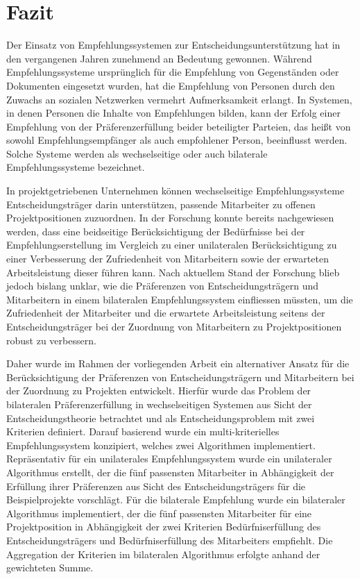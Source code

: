 
\chapter{Fazit}
\label{ch:fazit}
Der Einsatz von Empfehlungssystemen zur Entscheidungsunterstützung hat in den vergangenen Jahren zunehmend an Bedeutung gewonnen.
Während Empfehlungssysteme ursprünglich für die Empfehlung von Gegenständen oder Dokumenten eingesetzt wurden, hat die Empfehlung von Personen durch den Zuwachs an sozialen Netzwerken vermehrt Aufmerksamkeit erlangt.
In Systemen, in denen Personen die Inhalte von Empfehlungen bilden, kann der Erfolg einer Empfehlung von der Präferenzerfüllung beider beteiligter Parteien, das heißt von sowohl Empfehlungsempfänger als auch empfohlener Person, beeinflusst werden.
Solche Systeme werden als wechselseitige oder auch bilaterale Empfehlungssysteme bezeichnet.

In projektgetriebenen Unternehmen können wechselseitige Empfehlungssysteme Entscheidungsträger darin unterstützen, passende Mitarbeiter zu offenen Projektpositionen zuzuordnen.
In der Forschung konnte bereits nachgewiesen werden, dass eine beidseitige Berücksichtigung der Bedürfnisse bei der Empfehlungserstellung im Vergleich zu einer unilateralen Berücksichtigung zu einer Verbesserung der Zufriedenheit von Mitarbeitern sowie der erwarteten Arbeitsleistung dieser führen kann.
Nach aktuellem Stand der Forschung blieb jedoch bislang unklar, wie die Präferenzen von Entscheidungsträgern und Mitarbeitern in einem bilateralen Empfehlungssystem einfliessen müssten, um die Zufriedenheit der Mitarbeiter und die erwartete Arbeitsleistung seitens der Entscheidungsträger bei der Zuordnung von Mitarbeitern zu Projektpositionen robust zu verbessern.

Daher wurde im Rahmen der vorliegenden Arbeit ein alternativer Ansatz für die Berücksichtigung der Präferenzen von Entscheidungsträgern und Mitarbeitern bei der Zuordnung zu Projekten entwickelt.
Hierfür wurde das Problem der bilateralen Präferenzerfüllung in wechselseitigen Systemen aus Sicht der Entscheidungstheorie betrachtet und als Entscheidungsproblem mit zwei Kriterien definiert.
Darauf basierend wurde ein multi-kriterielles Empfehlungssystem konzipiert, welches zwei Algorithmen implementiert.
Repräsentativ für ein unilaterales Empfehlungssystem wurde ein unilateraler Algorithmus erstellt, der die fünf passensten Mitarbeiter in Abhängigkeit der Erfüllung ihrer Präferenzen aus Sicht des Entscheidungsträgers für die Beispielprojekte vorschlägt.
Für die bilaterale Empfehlung wurde ein bilateraler Algorithmus implementiert, der die fünf passensten Mitarbeiter für eine Projektposition in Abhängigkeit der zwei Kriterien Bedürfniserfüllung des Entscheidungsträgers und Bedürfniserfüllung des Mitarbeiters empfiehlt.
Die Aggregation der Kriterien im bilateralen Algorithmus erfolgte anhand der gewichteten Summe.

